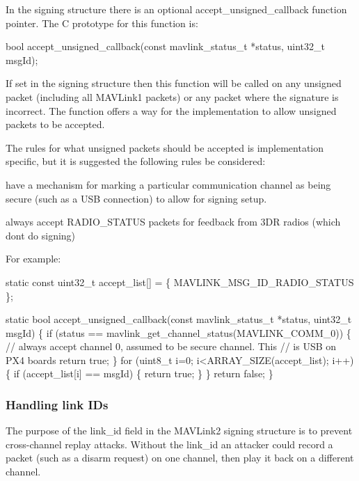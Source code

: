 In the signing structure there is an optional accept\+\_\+unsigned\+\_\+callback function pointer. The C prototype for this function is\+:


\begin{DoxyCode}
bool accept\_unsigned\_callback(const mavlink\_status\_t *status, uint32\_t msgId);
\end{DoxyCode}


If set in the signing structure then this function will be called on any unsigned packet (including all M\+A\+V\+Link1 packets) or any packet where the signature is incorrect. The function offers a way for the implementation to allow unsigned packets to be accepted.

The rules for what unsigned packets should be accepted is implementation specific, but it is suggested the following rules be considered\+:


\begin{DoxyItemize}
\item have a mechanism for marking a particular communication channel as being secure (such as a U\+SB connection) to allow for signing setup.
\item always accept R\+A\+D\+I\+O\+\_\+\+S\+T\+A\+T\+US packets for feedback from 3\+DR radios (which don\textquotesingle{}t do signing)
\end{DoxyItemize}

For example\+:


\begin{DoxyCode}
static const uint32\_t accept\_list[] = \{
    MAVLINK\_MSG\_ID\_RADIO\_STATUS
\};

static bool accept\_unsigned\_callback(const mavlink\_status\_t *status, uint32\_t msgId)
\{
    if (status == mavlink\_get\_channel\_status(MAVLINK\_COMM\_0)) \{
        // always accept channel 0, assumed to be secure channel. This
        // is USB on PX4 boards
        return true;
    \}
    for (uint8\_t i=0; i<ARRAY\_SIZE(accept\_list); i++) \{
        if (accept\_list[i] == msgId) \{
            return true;
        \}
    \}
    return false;
\}
\end{DoxyCode}


\subsubsection*{Handling link I\+Ds}

The purpose of the link\+\_\+id field in the M\+A\+V\+Link2 signing structure is to prevent cross-\/channel replay attacks. Without the link\+\_\+id an attacker could record a packet (such as a disarm request) on one channel, then play it back on a different channel.

